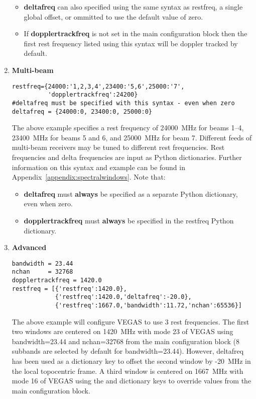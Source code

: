 \begin{description}[leftmargin=*,font=\bfseries\large]
\begin{enumerate}[label=\bfseries{\arabic*.},leftmargin=*]
\begin{itemize}[itemsep=0pt]
\item {\bf deltafreq} can also specified using the same syntax as restfreq, a
single global offset, or ommitted to use the default value of zero.
\item If {\bf dopplertrackfreq} is not set in the main configuration block then the
first rest frequency listed using this syntax will be doppler tracked by
default.
\end{itemize}

\item {\bf Multi-beam}
\begin{lstlisting}[language=PythonAstrid,frame=single,framerule=1pt]
restfreq={24000:'1,2,3,4',23400:'5,6',25000:'7',
          'dopplertrackfreq':24200}
#deltafreq must be specified with this syntax - even when zero
deltafreq = {24000:0, 23400:0, 25000:0}
\end{lstlisting}
The above example specifies a rest frequency of 24000~MHz for beams 1--4, 23400~MHz
for beams 5 and 6, and 25000~MHz for beam 7.
Different feeds of multi-beam receivers may be tuned to different rest frequencies.
Rest frequencies and delta frequencies are input as Python dictionaries.  Further
information on this syntax and example can be found in
Appendix~\ref{appendix:spectralwindows}.  Note that:

\begin{itemize}[itemsep=0pt]
\item {\bf deltafreq} must {\bf always} be specified as a separate Python dictionary, even when
zero.
\item {\bf dopplertrackfreq} must {\bf always} be specified in the restfreq Python dictionary.
\end{itemize}

\newpage
\item {\bf Advanced}

\begin{lstlisting}[language=PythonAstrid,frame=single,framerule=1pt]
bandwidth = 23.44
nchan     = 32768
dopplertrackfreq = 1420.0
restfreq = [{'restfreq':1420.0},
            {'restfreq':1420.0,'deltafreq':-20.0},
            {'restfreq':1667.0,'bandwidth':11.72,'nchan':65536}]
\end{lstlisting}

The above example will configure \gls{VEGAS} to use 3 rest frequencies.  The first
two windows are centered on 1420~MHz with mode 23 of \gls{VEGAS} using
bandwidth=23.44 and nchan=32768 from the main configuration block
(8 subbands are selected by default for bandwidth=23.44). However, deltafreq has been
used as a dictionary key to offset the second window by -20~MHz in the local topocentric
frame.  A third window is centered on 1667~MHz with mode 16 of \gls{VEGAS} using
the  and  dictionary keys to override values from the main
configuration block.


\end{enumerate}
\end{description}
